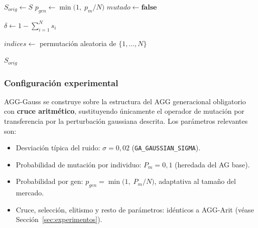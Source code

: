 \begin{algorithm}[H]
\SetAlgoLined
{}

$S_{orig} \leftarrow S$\;
$p_{gen} \leftarrow \min\bigl(1,\; p_m / N\bigr)$\;
$mutado \leftarrow \textbf{false}$\;



$\delta \leftarrow 1 - \sum_{i=1}^{N} s_i$\;


$indices \leftarrow$ permutación aleatoria de $\{1,\dots,N\}$\;

\Return $S_{orig}$\;
\caption{Mutación Gaussiana}
\label{alg:gaussian-mutation}
\end{algorithm}

\subsubsection{Configuración experimental}

AGG-Gauss se construye sobre la estructura del AGG generacional obligatorio con \textbf{cruce aritmético}, sustituyendo únicamente el operador de mutación por transferencia por la perturbación gaussiana descrita. Los parámetros relevantes son:

\begin{itemize}[noitemsep]
    \item Desviación típica del ruido: $\sigma = 0{,}02$ (\texttt{GA\_GAUSSIAN\_SIGMA}).
    \item Probabilidad de mutación por individuo: $P_m = 0{,}1$ (heredada del AG base).
    \item Probabilidad por gen: $p_{gen} = \min\bigl(1,\; P_m / N\bigr)$, adaptativa al tamaño del mercado.
    \item Cruce, selección, elitismo y resto de parámetros: idénticos a AGG-Arit (véase Sección~\ref{sec:experimentos}).
\end{itemize}

